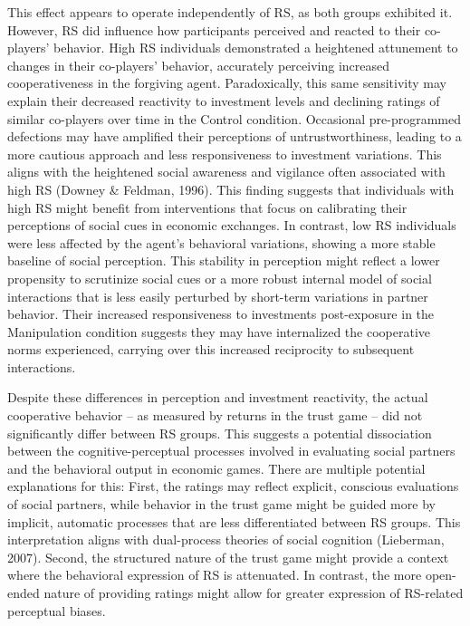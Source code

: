 \documentclass[
]{article}
\begin{document}
This effect appears to operate independently of RS, as both groups
exhibited it. However, RS did influence how participants perceived and
reacted to their co-players' behavior. High RS individuals demonstrated
a heightened attunement to changes in their co-players' behavior,
accurately perceiving increased cooperativeness in the forgiving agent.
Paradoxically, this same sensitivity may explain their decreased
reactivity to investment levels and declining ratings of similar
co-players over time in the Control condition. Occasional pre-programmed
defections may have amplified their perceptions of untrustworthiness,
leading to a more cautious approach and less responsiveness to
investment variations. This aligns with the heightened social awareness
and vigilance often associated with high RS (Downey \& Feldman, 1996).
This finding suggests that individuals with high RS might benefit from
interventions that focus on calibrating their perceptions of social cues
in economic exchanges. In contrast, low RS individuals were less
affected by the agent's behavioral variations, showing a more stable
baseline of social perception. This stability in perception might
reflect a lower propensity to scrutinize social cues or a more robust
internal model of social interactions that is less easily perturbed by
short-term variations in partner behavior. Their increased
responsiveness to investments post-exposure in the Manipulation
condition suggests they may have internalized the cooperative norms
experienced, carrying over this increased reciprocity to subsequent
interactions.

Despite these differences in perception and investment reactivity, the
actual cooperative behavior -- as measured by returns in the trust game --
did not significantly differ between RS groups. This suggests a
potential dissociation between the cognitive-perceptual processes
involved in evaluating social partners and the behavioral output in
economic games. There are multiple potential explanations for this:
First, the ratings may reflect explicit, conscious evaluations of social
partners, while behavior in the trust game might be guided more by
implicit, automatic processes that are less differentiated between RS
groups. This interpretation aligns with dual-process theories of social
cognition (Lieberman, 2007). Second, the structured nature of the
trust game might provide a context where the behavioral expression of RS
is attenuated. In contrast, the more open-ended nature of providing
ratings might allow for greater expression of RS-related perceptual
biases.
\end{document}
